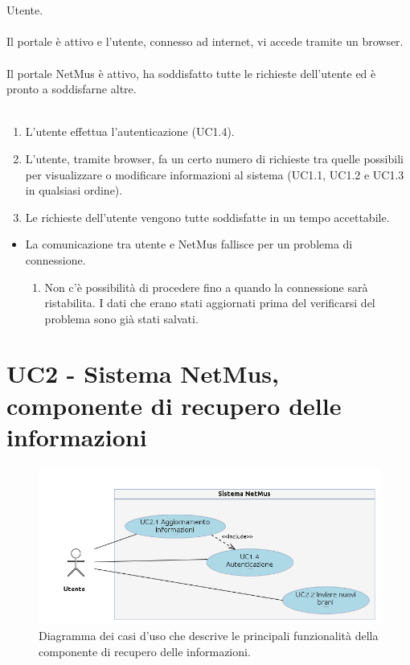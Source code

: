 \vspace*{0.5cm}
\\\\ 
 Utente. \\\\
 Il portale \`e attivo e l'utente, connesso ad internet, vi
accede tramite un browser. \\\\ 
 Il portale NetMus \`e attivo, ha soddisfatto tutte le
richieste dell'utente ed \`e pronto a soddisfarne altre. \\\\ 
\begin{enumerate}
  \item L'utente effettua l'autenticazione (UC1.4).
  \item L'utente, tramite browser, fa un certo numero di richieste tra quelle
  possibili per visualizzare o modificare informazioni al sistema (UC1.1, UC1.2
  e UC1.3 in qualsiasi ordine).
  \item Le richieste dell'utente vengono tutte soddisfatte in un tempo
  accettabile.
\end{enumerate}
\begin{itemize}
  \item La comunicazione tra utente e NetMus fallisce per un problema di
  connessione.
  \begin {enumerate}
    \item Non c'\`e possibilit\`a di procedere fino a quando la connessione sar\`a
    ristabilita. I dati che erano stati aggiornati prima del verificarsi del
    problema sono gi\`a stati salvati.
  \end{enumerate}
\end{itemize}
\newpage

\section{UC2 - Sistema NetMus, componente di recupero delle informazioni}

\begin{figure}[h]
  \centering
  \includegraphics[width=15cm]{img/AR/UC2.png}
\caption{Diagramma dei casi d'uso che descrive le principali funzionalit\`a della
componente di recupero delle informazioni.}
\end{figure}

